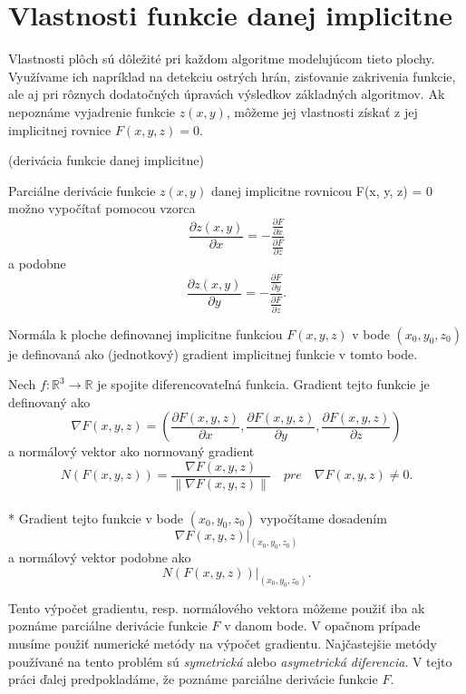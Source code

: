 \newpage

\section{Vlastnosti funkcie danej implicitne}
\label{kap:implicit_surface_properties}

Vlastnosti plôch sú dôležité pri každom algoritme modelujúcom tieto plochy. Využívame ich napríklad na detekciu ostrých hrán, 
zisťovanie zakrivenia funkcie, ale aj pri rôznych dodatočných úpravách výsledkov základných algoritmov.
Ak nepoznáme vyjadrenie funkcie $z(x, y)$, môžeme jej vlastnosti získať z jej implicitnej rovnice $F(x, y, z) = 0$.


\begin{theorem}
    (derivácia funkcie danej implicitne)

    Parciálne derivácie funkcie $z(x, y)$ danej implicitne rovnicou F(x, y, z) = 0 možno vypočítať pomocou vzorca
    $$\frac{\partial z(x, y)}{\partial x} = -\frac{\frac{\partial F}{\partial x}}{\frac{\partial F}{\partial z}}$$
    a podobne 
    $$\frac{\partial z(x, y)}{\partial y} = -\frac{\frac{\partial F}{\partial y}}{\frac{\partial F}{\partial z}}.$$
\end{theorem}

Normála k ploche definovanej implicitne funkciou $F(x,y,z)$ v bode $(x_0, y_0, z_0)$ je definovaná ako (jednotkový) 
gradient implicitnej funkcie  v tomto bode.

\begin{definition}
    Nech $f : \mathbb{R}^3 \to \mathbb{R}$ je spojite diferencovateľná funkcia. Gradient tejto 
    funkcie je definovaný ako 
    $$\nabla F(x, y, z) = (\frac{\partial F(x, y, z)}{\partial x}, \frac{\partial F(x, y, z)}{\partial y}, 
    \frac{\partial F(x, y, z)}{\partial z})$$
    a normálový vektor ako normovaný gradient
    $$N(F(x, y, z))  = \frac{\nabla F(x, y, z)}{\| \nabla F(x, y, z) \|} \,\,\,\,\,\, pre \,\,\,\,\,\,
    \nabla F(x,y,z) \neq 0.$$
    \\*
    Gradient tejto funkcie v bode $(x_0, y_0, z_0)$ vypočítame dosadením 
    $$\nabla F(x, y, z)\big|_{(x_0, y_0, z_0)}$$ 
    a normálový vektor podobne ako $$N(F(x, y, z))\big|_{(x_0, y_0, z_0)}.$$
\end{definition}

Tento výpočet gradientu, resp. normálového vektora môžeme použiť iba ak poznáme parciálne derivácie funkcie $F$ v danom bode.
V opačnom prípade musíme použiť numerické metódy na výpočet gradientu. Najčastejšie metódy používané na tento problém sú 
\textit{symetrická} alebo \textit{asymetrická diferencia}. V tejto práci ďalej predpokladáme, že poznáme parciálne derivácie funkcie $F$.


